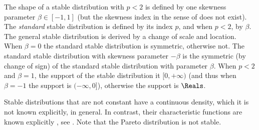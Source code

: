 The shape of a stable distribution with $p<2$ is
defined by one skewness parameter $\beta\in
[-1,1]$ (but the skewness index in the sense of
 does not exist). The
\emph{standard} stable distribution is defined by
its index $p$, and when $p<2$, by $\beta$. The
general stable distribution is derived by a
change of scale and location. When $\beta=0$ the
standard stable distribution is symmetric,
otherwise not. The standard stable distribution
with skewness parameter $-\beta$ is the symmetric
(by change of sign) of the standard stable
distribution with parameter $\beta$. When $p<2$
and $\beta=1$, the support of the stable
distribution it $[0,+\infty)$ (and thus when
$\beta=-1$ the support is $(-\infty,0]$),
otherwise the support is $\Reals$.

Stable distributions that are not constant have a
continuous density, which it is not known
explicitly, in general. In contrast, their
characteristic functions are known explicitly
\cite{samorodnitsky1994stable,nolan2009stable},
see  . Note that the Pareto
distribution is not stable.

